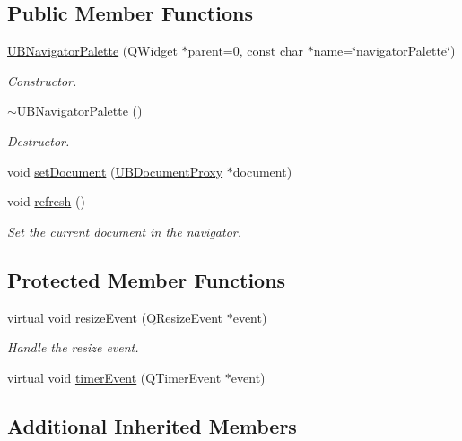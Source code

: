 \subsection*{Public Member Functions}
\begin{DoxyCompactItemize}
\item 
\hyperlink{class_u_b_navigator_palette_af31ae14fb3493ccb48045750db25ff52}{U\-B\-Navigator\-Palette} (Q\-Widget $\ast$parent=0, const char $\ast$name=\char`\"{}navigator\-Palette\char`\"{})
\begin{DoxyCompactList}\small\item\em Constructor. \end{DoxyCompactList}\item 
\hyperlink{class_u_b_navigator_palette_a37efebc072cb760057d44dfe27aca46c}{$\sim$\-U\-B\-Navigator\-Palette} ()
\begin{DoxyCompactList}\small\item\em Destructor. \end{DoxyCompactList}\item 
void \hyperlink{class_u_b_navigator_palette_abd0e9d7888c73f384b02f11e0ea1c486}{set\-Document} (\hyperlink{class_u_b_document_proxy}{U\-B\-Document\-Proxy} $\ast$document)
\item 
void \hyperlink{class_u_b_navigator_palette_ae91f6e46f50e29ae8f65052ccc375a2c}{refresh} ()
\begin{DoxyCompactList}\small\item\em Set the current document in the navigator. \end{DoxyCompactList}\end{DoxyCompactItemize}
\subsection*{Protected Member Functions}
\begin{DoxyCompactItemize}
\item 
virtual void \hyperlink{class_u_b_navigator_palette_a6ee06feda0cccbfd3a5071368e0ce142}{resize\-Event} (Q\-Resize\-Event $\ast$event)
\begin{DoxyCompactList}\small\item\em Handle the resize event. \end{DoxyCompactList}\item 
virtual void \hyperlink{class_u_b_navigator_palette_a64fae0f48b21071d304508fc5e3a10b7}{timer\-Event} (Q\-Timer\-Event $\ast$event)
\end{DoxyCompactItemize}
\subsection*{Additional Inherited Members}


